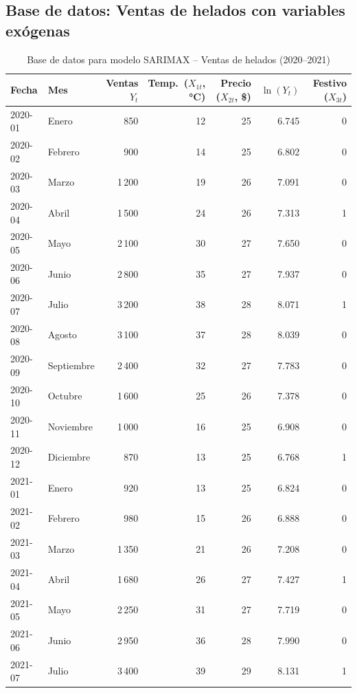 \documentclass[12pt, a4paper]{article}
\begin{document}
\subsection{Base de datos: Ventas de helados con variables exógenas}

\begin{table}[H]
  \centering
  \caption{Base de datos para modelo SARIMAX -- Ventas de helados (2020--2021)}
  \label{tab:helados}
  \small
  \begin{tabular}{llrrrrr}
    \toprule
    \textbf{Fecha} & \textbf{Mes} & \textbf{Ventas $Y_t$} & \textbf{Temp.\ ($X_{1t}$, °C)} & \textbf{Precio ($X_{2t}$, \$)} & $\ln(Y_t)$ & \textbf{Festivo ($X_{3t}$)} \\
    \midrule
    2020-01 & Enero      &   850 & 12 & 25 & 6.745 & 0 \\
    2020-02 & Febrero    &   900 & 14 & 25 & 6.802 & 0 \\
    2020-03 & Marzo      & 1\,200 & 19 & 26 & 7.091 & 0 \\
    2020-04 & Abril      & 1\,500 & 24 & 26 & 7.313 & 1 \\
    2020-05 & Mayo       & 2\,100 & 30 & 27 & 7.650 & 0 \\
    2020-06 & Junio      & 2\,800 & 35 & 27 & 7.937 & 0 \\
    2020-07 & Julio      & 3\,200 & 38 & 28 & 8.071 & 1 \\
    2020-08 & Agosto     & 3\,100 & 37 & 28 & 8.039 & 0 \\
    2020-09 & Septiembre & 2\,400 & 32 & 27 & 7.783 & 0 \\
    2020-10 & Octubre    & 1\,600 & 25 & 26 & 7.378 & 0 \\
    2020-11 & Noviembre  & 1\,000 & 16 & 25 & 6.908 & 0 \\
    2020-12 & Diciembre  &   870 & 13 & 25 & 6.768 & 1 \\
    2021-01 & Enero      &   920 & 13 & 25 & 6.824 & 0 \\
    2021-02 & Febrero    &   980 & 15 & 26 & 6.888 & 0 \\
    2021-03 & Marzo      & 1\,350 & 21 & 26 & 7.208 & 0 \\
    2021-04 & Abril      & 1\,680 & 26 & 27 & 7.427 & 1 \\
    2021-05 & Mayo       & 2\,250 & 31 & 27 & 7.719 & 0 \\
    2021-06 & Junio      & 2\,950 & 36 & 28 & 7.990 & 0 \\
    2021-07 & Julio      & 3\,400 & 39 & 29 & 8.131 & 1 \\

\end{tabular}
\end{table}
\end{document}
